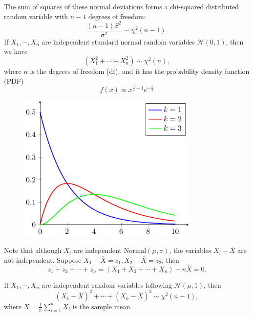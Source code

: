 \begin{minipage}{0.5\textwidth}
The sum of squares of these normal deviations forms a chi-squared distributed random variable with \(n - 1\) degrees of freedom:
\[
  \frac{(n-1)S^2}{\sigma^2} \sim \chi^2(n-1).
\]
If \(X_1, \cdots, X_n\) are independent standard normal random variables \(\mathcal{N}(0, 1)\), then we have 
\[
  (X_1^2 + \cdots + X_n^2) \sim \chi^2(n),
\]
where \(n\) is the degrees of freedom (df), and it has the probability density function (PDF) 
\[
  f(x) \propto x^{\frac{n}{2} - 1} e^{-\frac{x}{2}}
\]
\end{minipage}
\begin{minipage}{0.5\textwidth}
  \begin{figure}[H]
    \centering
    \includegraphics[width=0.8\textwidth]{Figures/chi-squared.pdf}
  \end{figure}
\end{minipage}

\begin{remark}
  Note that although \(X_i\) are independent \(\text{Normal}(\mu, \sigma)\), the variables \(X_i - \overline{X}\) are not independent. Suppose \(X_1 - \overline{X} = z_1, X_2 - \overline{X} = z_2\), then  
  \[
  z_1 + z_2 + \cdots + z_n = (X_1 + X_2 + \cdots + X_n) - n\overline{X} = 0.
  \]  
\end{remark}

\begin{theorem}
  If \(X_1, \cdots, X_n\) are independent random variables following \(\mathcal{N}(\mu, 1)\), then
  \[
    (X_1 - \overline{X})^2 + \cdots + (X_n - \overline{X})^2 \sim \chi^2(n - 1),
  \]
  where \(\overline{X} = \frac{1}{n}\sum_{i=1}^n X_i\) is the sample mean.
\end{theorem}

